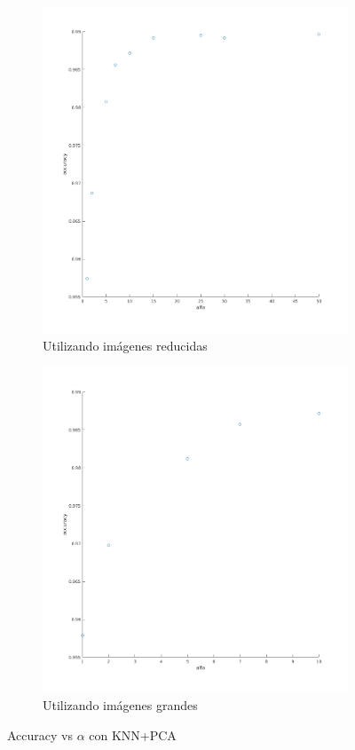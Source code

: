 \begin{figure}[H]
\begin{subfigure}[h]{0.62\linewidth}
\includegraphics[width=\linewidth]{img/alfa_pca_accu.png}
\caption{Utilizando imágenes reducidas}
\end{subfigure}
\hfill
\begin{subfigure}[h]{0.62\linewidth}
\includegraphics[width=\linewidth]{img/big_alfa_pca_accu.png}
\caption{Utilizando imágenes grandes}
\end{subfigure}%
\caption{Accuracy vs $\alpha$ con KNN+PCA}
\end{figure}

